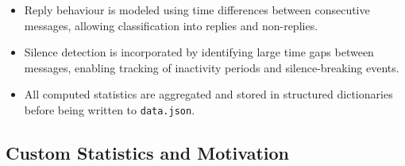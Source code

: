 \documentclass[11pt,a4paper]{article}
\begin{document}
\begin{itemize}
    \item Reply behaviour is modeled using time differences between consecutive messages, allowing classification into replies and non-replies.

    \item Silence detection is incorporated by identifying large time gaps between messages, enabling tracking of inactivity periods and silence-breaking events.

    \item All computed statistics are aggregated and stored in structured dictionaries before being written to \texttt{data.json}.
\end{itemize}

\subsection{Custom Statistics and Motivation}
\end{document}
